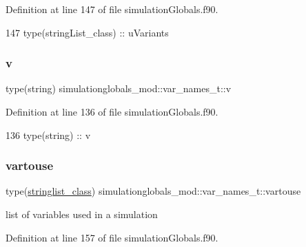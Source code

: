 Definition at line 147 of file simulation\+Globals.\+f90.


\begin{DoxyCode}
147         \textcolor{keywordtype}{type}(stringList\_class) :: uVariants
\end{DoxyCode}
\mbox{\label{structsimulationglobals__mod_1_1var__names__t_a037c76a1788e918a911686b1a357b63c}} 
\subsubsection{\texorpdfstring{v}{v}}
{\footnotesize\ttfamily type(string) simulationglobals\+\_\+mod\+::var\+\_\+names\+\_\+t\+::v\hspace{0.3cm}{\ttfamily [private]}}



Definition at line 136 of file simulation\+Globals.\+f90.


\begin{DoxyCode}
136         \textcolor{keywordtype}{type}(string) :: v
\end{DoxyCode}
\mbox{\label{structsimulationglobals__mod_1_1var__names__t_a53aa98ee01e1fa414c511cdc8066873c}} 
\subsubsection{\texorpdfstring{vartouse}{vartouse}}
{\footnotesize\ttfamily type(\mbox{\hyperlink{structsimulationglobals__mod_1_1stringlist__class}{stringlist\+\_\+class}}) simulationglobals\+\_\+mod\+::var\+\_\+names\+\_\+t\+::vartouse\hspace{0.3cm}{\ttfamily [private]}}



list of variables used in a simulation 



Definition at line 157 of file simulation\+Globals.\+f90.


